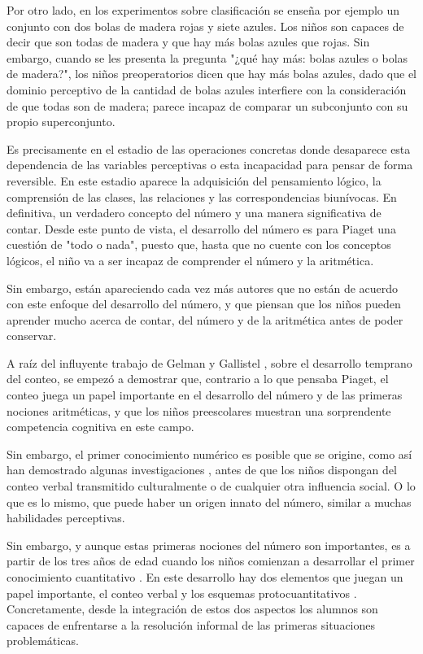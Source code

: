 \documentclass{article}
\begin{document}
Por otro lado, en los experimentos sobre clasificación se enseña por ejemplo un conjunto con dos bolas de madera rojas y siete azules. Los niños son capaces de decir que son todas de madera y que hay más bolas azules que rojas. Sin embargo, cuando se les presenta la pregunta "¿qué hay más: bolas azules o bolas de madera?", los niños preoperatorios dicen que hay más bolas azules, dado que el dominio perceptivo de la cantidad de bolas azules interfiere con la consideración de que todas son de madera; parece incapaz de comparar un subconjunto con su propio superconjunto.

Es precisamente en el estadio de las operaciones concretas donde desaparece esta dependencia de las variables perceptivas o esta incapacidad para pensar de forma reversible. En este estadio aparece la adquisición del pensamiento lógico, la comprensión de las clases, las relaciones y las correspondencias biunívocas. En definitiva, un verdadero concepto del número y una manera significativa de contar. Desde este punto de vista, el desarrollo del número es para Piaget una cuestión de "todo o nada", puesto que, hasta que no cuente con los conceptos lógicos, el niño va a ser incapaz de comprender el número y la aritmética.

Sin embargo, están apareciendo cada vez más autores que no están de acuerdo con este enfoque del desarrollo del número, y que piensan que los niños pueden aprender mucho acerca de contar, del número y de la aritmética antes de poder conservar.

A raíz del influyente trabajo de Gelman y Gallistel \cite{german1978child}, sobre el desarrollo temprano del conteo, se empezó a demostrar que, contrario a lo que pensaba Piaget, el conteo juega un papel importante en el desarrollo del número y de las primeras nociones aritméticas, y que los niños preescolares muestran una sorprendente competencia cognitiva en este campo.

Sin embargo, el primer conocimiento numérico es posible que se origine, como así han demostrado algunas investigaciones \cite{carpenter2020development,kintsch1985understanding}, antes de que los niños dispongan del conteo verbal transmitido culturalmente o de cualquier otra influencia social. O lo que es lo mismo, que puede haber un origen innato del número, similar a muchas habilidades perceptivas.

Sin embargo, y aunque estas primeras nociones del número son importantes, es a partir de los tres años de edad cuando los niños comienzan a desarrollar el primer conocimiento cuantitativo \cite{orrantia2003rol}. En este desarrollo hay dos elementos que juegan un papel importante, el conteo verbal y los esquemas protocuantitativos \cite{resnick2020protoquantities}. Concretamente, desde la integración de estos dos aspectos los alumnos son capaces de enfrentarse a la resolución informal de las primeras situaciones problemáticas.
\end{document}

